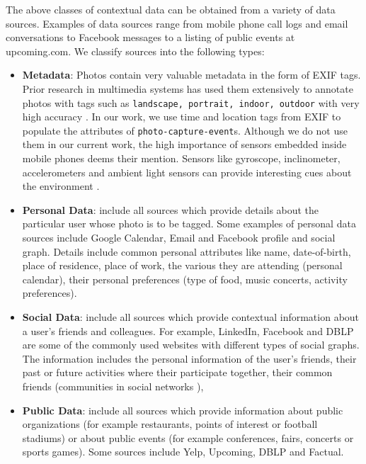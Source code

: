 The above classes of contextual data can be obtained from a variety of data sources. Examples of data sources range from mobile phone call logs and email conversations to Facebook messages to a listing of public events at upcoming.com. We classify sources into the following types:

\begin{itemize}
\item \textbf{Metadata}: Photos contain very valuable metadata in the form of EXIF tags. Prior research in multimedia systems has used them extensively to annotate photos with tags such as \texttt{landscape, portrait, indoor, outdoor} with very high accuracy \cite{boutell2004photo, sinha2008concept}. In our work, we use time and location tags from EXIF to populate the attributes of \texttt{photo-capture-event}s. Although we do not use them in our current work, the high importance of sensors embedded inside mobile phones deems their mention. Sensors like gyroscope, inclinometer, accelerometers and ambient light sensors can provide interesting cues about the environment \cite{patterson2005assisted, siewiorek2003sensay}.

\item \textbf{Personal Data}: include all sources which provide details about the particular user whose photo is to be tagged. Some examples of personal data sources include Google Calendar, Email and Facebook profile and social graph. Details include common personal attributes like name, date-of-birth, place of residence, place of work, the various they are attending (personal calendar), their personal preferences (type of food, music concerts, activity preferences).

\item \textbf{Social Data}: include all sources which provide contextual information about a user's friends and colleagues. For example, LinkedIn, Facebook and DBLP are some of the commonly used websites with different types of social graphs. The information includes the personal information of the user's friends, their past or future activities where their participate together, their common friends (communities in social networks \cite{backstrom2006group, krawczyk2009communities}), 

\item \textbf{Public Data}: include all sources which provide information about public organizations (for example restaurants, points of interest or football stadiums) or about public events (for example conferences, fairs, concerts or sports games). Some sources include Yelp, Upcoming, DBLP and Factual.
\end{itemize}

